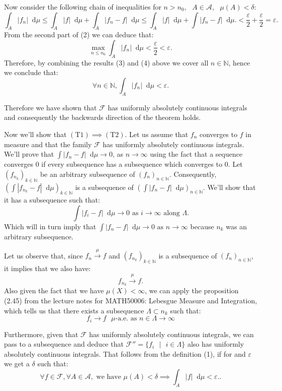 \documentclass[11pt]{article}
\newcommand\st{\text{ } | \text{ }}
\newcommand\N{\mathbb{N}}
\newcommand\A{\mathcal{A}}
\newcommand\weh{\text{ we have }}
\newcommand\as{\text{ as }}
\newcommand\sep{\text{ }}
\newcommand*\diff{\mathop{}\!\mathrm{d}}
\begin{document}
Now consider the following chain of inequalities for $n > n_0,\sep A \in \A,\sep \mu(A) < \delta$:
\begin{equation}
\int_A |f_n| \diff\mu \le \int_A |f| \diff\mu + \int_A |f_n - f| \diff\mu \le \int_A |f| \diff\mu + \int |f_n - f| \diff\mu. < \frac{\varepsilon}{2} + \frac{\varepsilon}{2} = \varepsilon.
\end{equation}
From the second part of (2) we can deduce that:
\begin{equation}
\max_{n \le n_0}\int_A |f_n| \diff\mu < \frac{\varepsilon}{2} < \varepsilon.
\end{equation}
Therefore, by combining the results (3) and (4) above we cover all $n \in \N$, hence
we conclude that:
\[
\forall n \in \N, \int_A |f_n| \diff\mu < \varepsilon
.\]

Therefore we have shown that $\mathcal{F}$ has uniformly absolutely continuous
integrals and consequently the backwards direction of the theorem holds.

Now we'll show that $(\text{T}1) \implies (\text{T}2)$.
Let us assume that $f_n$ converges to $f$ in measure and that the family $\mathcal{F}$
has uniformly absolutely continuous integrals. We'll prove that
$\int |f_n - f| \diff\mu \to 0$, as $n \to \infty$ using the fact that a sequence
converges 0 if every subsequence has a subsequence which converges to 0.
Let $(f_{n_k})_{k\in\N}$ be an arbitrary subsequence of  $(f_{n})_{n\in\N}$.
Consequently, $(\int |f_{n_k} - f| \diff\mu)_{k\in\N}$ is a subsequence of
$(\int |f_{n} - f| \diff\mu)_{n\in\N}$. We'll show that it has a subsequence such that:
\[
  \int |f_{i} - f| \diff\mu \to 0 \as i \to \infty \text{ along } \Lambda
.\]
Which will in turn imply that $\int |f_{n} - f| \diff\mu \to 0 \as n \to \infty $
because $n_k$ was an arbitrary subsequence.

Let us observe that, since $f_n \xrightarrow{\mu} f$ and $(f_{n_k})_{k\in\N}$
is a subsequence of  $(f_{n})_{n\in\N}$, it implies that we also have:
\[
f_{n_k} \xrightarrow{\mu} f
.\]
Also given the fact that we have $\mu(X) < \infty$, we can apply the proposition
(2.45) from the lecture notes for  MATH50006: Lebesgue Measure and Integration, which
tells us that there exists a subsequence $\Lambda \subset n_k$ such that:
\begin{equation}
  f_i \to f \text{ }\mu\text{-a.e.} \as n \in \Lambda \to \infty
\end{equation}

Furthermore, given that $\mathcal{F}$ has uniformly absolutely continuous integrals,
we can pass to a subsequence and deduce that  $\mathcal{F}'' = \lbrace f_i \st i \in \Lambda \rbrace$
also has uniformly absolutely continuous integrals. That follows from the definition
(1), if for and $\varepsilon$ we get a  $\delta$ such that:
\[
\forall f \in \mathcal{F},
  \forall A \in \mathcal{A}, \weh \mu(A) < \delta \implies \int_A |f|\diff \mu < \varepsilon.
.\]
\end{document}
